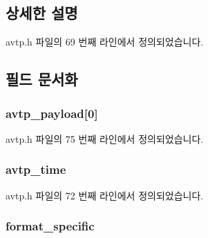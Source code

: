 \subsection{상세한 설명}


avtp.\+h 파일의 69 번째 라인에서 정의되었습니다.



\subsection{필드 문서화}
\subsubsection[{\texorpdfstring{avtp\+\_\+payload}{avtp_payload}}]{ avtp\+\_\+payload\mbox{[}0\mbox{]}}\hypertarget{structavtp__stream__pdu_af7de5ad9772244bef16d6266d874498d}{}\label{structavtp__stream__pdu_af7de5ad9772244bef16d6266d874498d}


avtp.\+h 파일의 75 번째 라인에서 정의되었습니다.

\subsubsection[{\texorpdfstring{avtp\+\_\+time}{avtp_time}}]{ avtp\+\_\+time}\hypertarget{structavtp__stream__pdu_a81ec49d93f7a916531f4d97214f47515}{}\label{structavtp__stream__pdu_a81ec49d93f7a916531f4d97214f47515}


avtp.\+h 파일의 72 번째 라인에서 정의되었습니다.

\subsubsection[{\texorpdfstring{format\+\_\+specific}{format_specific}}]{ format\+\_\+specific}\hypertarget{structavtp__stream__pdu_acbfc36b550978f88cf0a3d9d2b2ce0dd}{}\label{structavtp__stream__pdu_acbfc36b550978f88cf0a3d9d2b2ce0dd}


